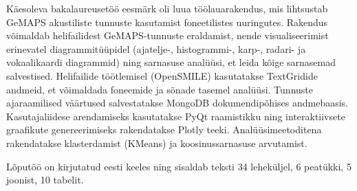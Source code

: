 Käesoleva bakalaureusetöö eesmärk oli luua töölauarakendus, mis lihtsustab GeMAPS akustiliste tunnuste kasutamist foneetilistes uuringutes. Rakendus võimaldab helifailidest GeMAPS-tunnuste eraldamist, nende visualiseerimist erinevatel diagrammitüüpidel (ajatelje-, histogrammi-, karp-, radari- ja vokaalikaardi diagrammid) ning sarnasuse analüüsi, et leida kõige sarnasemad salvestised. Helifailide töötlemisel (OpenSMILE) kasutatakse TextGridide andmeid, et võimaldada foneemide ja sõnade tasemel analüüsi. Tunnuste ajaraamilised väärtused salvestatakse MongoDB dokumendipõhises andmebaasis. Kasutajaliidese arendamiseks kasutatakse PyQt raamistikku ning interaktiivsete graafikute genereerimiseks rakendatakse Plotly teeki. Analüüsimeetoditena rakendatakse klasterdamist (KMeans) ja koosinussarnasuse arvutamist.

Lõputöö on kirjutatud eesti keeles ning sisaldab teksti 34 leheküljel, 6 peatükki, 5 joonist, 10 tabelit.
